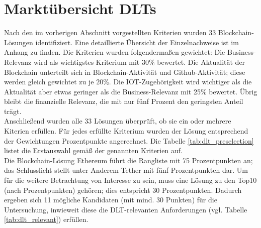 \section{Marktübersicht DLTs}
\label{sec:dlt_selection:market}
Nach den im vorherigen Abschnitt vorgestellten Kriterien wurden 33 Blockchain-Lösungen identifiziert. Eine detaillierte Übersicht der Einzelnachweise ist im Anhang zu finden. Die Kriterien wurden folgendermaßen gewichtet: Die Business-Relevanz wird als wichtigstes Kriterium mit 30\% bewertet. Die Aktualität der Blockchain unterteilt sich in Blockchain-Aktivität und Github-Aktivität; diese werden gleich gewichtet zu je 20\%. Die IOT-Zugehörigkeit wird wichtiger als die Aktualität aber etwas geringer als die Business-Relevanz mit 25\% bewertet. Übrig bleibt die finanzielle Relevanz, die mit nur fünf Prozent den geringsten Anteil trägt.\\
Anschließend wurden alle 33 Lösungen überprüft, ob sie ein oder mehrere Kiterien erfüllen. Für jedes erfüllte Kriterium wurden der Lösung entsprechend der Gewichtungen Prozentpunkte angerechnet. Die Tabelle \ref{tab:dlt_preselection} listet die Erstauswahl gemäß der genannten Kriterien auf.\\
Die Blockchain-Lösung Ethereum führt die Rangliste mit 75 Prozentpunkten an; das Schlusslicht stellt unter Anderem Tether mit fünf Prozentpunkten dar. Um für die weitere Betrachtung von Interesse zu sein, muss eine Lösung zu den Top10 (nach Prozentpunkten) gehören; dies entspricht 30 Prozentpunkten. Dadurch ergeben sich 11 mögliche Kandidaten (mit mind. 30 Punkten) für die Untersuchung, inwieweit diese die \ac{DLT}-relevanten Anforderungen (vgl. Tabelle \ref{tab:dlt_relevant}) erfüllen.

